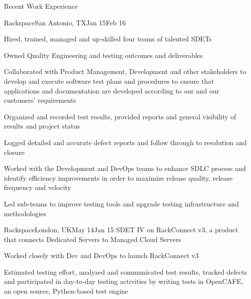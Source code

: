 \documentclass{resume} %
\begin{document}
\begin{rSection}{Recent Work Experience}
\begin{rSubsection}{Rackspace}{San Antonio, TX}{Jan 15}{Feb 16}
\item Hired, trained, managed and up-skilled four teams of talented SDETs
\item Owned Quality Engineering and testing outcomes and deliverables
\item Collaborated with Product Management, Development and other stakeholders to develop and execute software test plans and procedures to ensure that applications and documentation are developed according to our and our customers' requirements
\item Organized and recorded test results, provided reports and general visibility of results and project status
\item Logged detailed and accurate defect reports and follow through to resolution and closure
\item Worked with the Development and DevOps teams to enhance SDLC process and identify efficiency improvements in order to maximize release quality, release frequency and velocity
\item Led sub-teams to improve testing tools and upgrade testing infrastructure and methodologies

\end{rSubsection}


\begin{rSubsection}{Rackspace}{London, UK}{May 14}{Jan 15}
{SDET IV on RackConnect v3, a product that connects Dedicated Servers to Managed Cloud Servers}

\item Worked closely with Dev and DevOps to launch RackConnect v3
\item Estimated testing effort, analyzed and communicated test results, tracked defects and participated in day-to-day testing activities by writing tests in OpenCAFE, an open source, Python-based test engine
\end{rSubsection}
\end{rSection}

\end{document}
